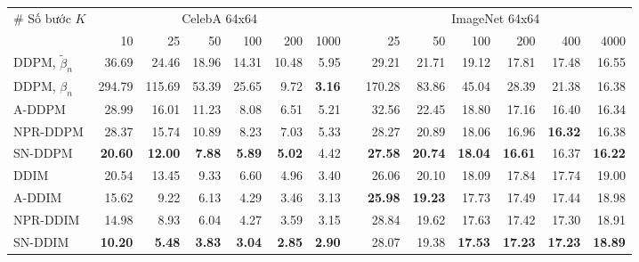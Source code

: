 \documentclass[14pt, a4paper]{article}
\numberwithin{equation}{section}
\numberwithin{figure}{section}
\numberwithin{dl}{section}
\numberwithin{md}{section}
\numberwithin{bd}{section}
\numberwithin{dn}{section}
\numberwithin{hq}{section}
\begin{document}
\begin{table}[h!]
{\begin{tabular}{ lrrrrrrrrrrrrr  }
                \hline
            \end{tabular}
        }
        \resizebox{\columnwidth}{!} {
            \begin{tabular}{ lrrrrrrrrrrrrr  }
                \hline
                \multirow{2}{*}{\# Số bước $K$} & \multicolumn{6}{c}{CelebA 64x64} & & \multicolumn{6}{c}{ImageNet 64x64} \\ \cline{2-7} \cline{9-14}
                & 10 & 25 & 50 & 100 & 200 & 1000 & & 25 & 50 & 100 & 200 & 400 & 4000 \\
                \hline
                DDPM, $\tilde{\beta}_n$ & 36.69 & 24.46 & 18.96 & 14.31 & 10.48 & 5.95 & & 29.21 & 21.71 & 19.12 & 17.81 & 17.48 & 16.55 \\
                DDPM, $\beta_n$ & 294.79 & 115.69 & 53.39 & 25.65 & 9.72 & \textbf{3.16} & & 170.28 & 83.86 & 45.04 & 28.39 & 21.38 & 16.38 \\
                A-DDPM & 28.99 & 16.01 & 11.23 & 8.08 & 6.51 & 5.21 & & 32.56 & 22.45 & 18.80 & 17.16 & 16.40 & 16.34 \\
                NPR-DDPM & 28.37 & 15.74 & 10.89 & 8.23 & 7.03 & 5.33 & & 28.27 & 20.89 & 18.06 & 16.96 & \textbf{16.32} & 16.38 \\
                SN-DDPM & \textbf{20.60} & \textbf{12.00} & \textbf{7.88} & \textbf{5.89} & \textbf{5.02} & 4.42 & & \textbf{27.58} & \textbf{20.74} & \textbf{18.04} & \textbf{16.61} & 16.37 & \textbf{16.22} \\
                \hline
                DDIM & 20.54 & 13.45 & 9.33 & 6.60 & 4.96 & 3.40 & & 26.06 & 20.10 & 18.09 & 17.84 & 17.74 & 19.00 \\
                A-DDIM & 15.62 & 9.22 & 6.13 & 4.29 & 3.46 & 3.13 & & \textbf{25.98} & \textbf{19.23} & 17.73 & 17.49 & 17.44 & 18.98 \\
                NPR-DDIM & 14.98 & 8.93 & 6.04 & 4.27 & 3.59 & 3.15 & & 28.84 & 19.62 & 17.63 & 17.42 & 17.30 & 18.91 \\
                SN-DDIM & \textbf{10.20} & \textbf{5.48} & \textbf{3.83} & \textbf{3.04} & \textbf{2.85} & \textbf{2.90} & & 28.07 & 19.38 & \textbf{17.53} & \textbf{17.23} & \textbf{17.23} & \textbf{18.89} \\
                \hline
            \end{tabular}
        }
        \begin{center}
\end{center}
\end{table}
\end{document}

